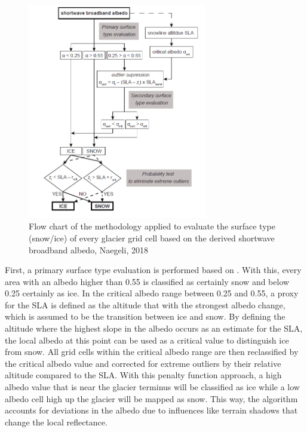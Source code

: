 \documentclass[12pt]{article}
\begin{document}
\begin{figure}[H]
\centering
\includegraphics[width=0.7\textwidth]{naegl_algorithm}
\caption{Flow chart of the methodology applied to evaluate the surface type (snow/ice) of every glacier grid cell based on the derived
shortwave broadband albedo, Naegeli, 2018}
\label{fig:naegli}
\end{figure}
First, a primary surface type evaluation is performed based on \cite{Cuffey2010}. With this, every area with an albedo higher than 0.55 is classified as certainly snow and below 0.25 certainly as ice. In the critical albedo range between 0.25 and 0.55, a proxy for the SLA is defined as the altitude that with the strongest albedo change, which is assumed to be the transition between ice and snow. By defining the altitude where the highest slope in the albedo occurs as an estimate for the SLA, the local albedo at this point can be used as a critical value to distinguish ice from snow. All grid cells within the critical albedo range are then reclassified by the critical albedo value and corrected for extreme outliers by their relative altitude compared to the SLA. With this penalty function approach, a high albedo value that is near the glacier terminus will be classified as ice while a low albedo cell high up the glacier will be mapped as snow. This way, the algorithm accounts for deviations in the albedo due to influences like terrain shadows that change the local reflectance. \\
\\
\end{document}
